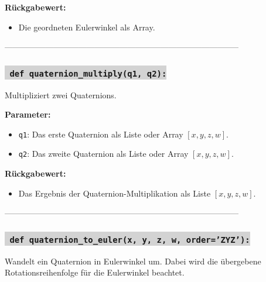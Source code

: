 \noindent \textbf{Rückgabewert:} \vspace{-6ex} \\
\begin{itemize}
    \setlength{\itemindent}{1em}
    \item Die geordneten Eulerwinkel als Array.
\end{itemize}

--------------------------------------------------------------------------------------


\subsubsection*{\colorbox{lightgray}{\texttt{\textbf{\color{green} def} \color{blue} quaternion\_multiply}\textbf{\texttt{(q1, q2):}}}}
Multipliziert zwei Quaternions.

\noindent \textbf{Parameter:} \vspace{-6ex} \\
\begin{itemize}
    \setlength{\itemindent}{1em}
    \item \texttt{q1}: Das erste Quaternion als Liste oder Array \([x, y, z, w]\).
    \item \texttt{q2}: Das zweite Quaternion als Liste oder Array \([x, y, z, w]\).
\end{itemize}

\noindent \textbf{Rückgabewert:} \vspace{-6ex} \\
\begin{itemize}
    \setlength{\itemindent}{1em}
    \item Das Ergebnis der Quaternion-Multiplikation als Liste \([x, y, z, w]\).
\end{itemize}

--------------------------------------------------------------------------------------



\subsubsection*{\colorbox{lightgray}{\texttt{\textbf{\color{green} def} \color{blue} quaternion\_to\_euler}\textbf{\texttt{(x, y, z, w, order='ZYZ'):}}}}
Wandelt ein Quaternion in Eulerwinkel um. Dabei wird die übergebene Rotationsreihenfolge für die Eulerwinkel beachtet.

